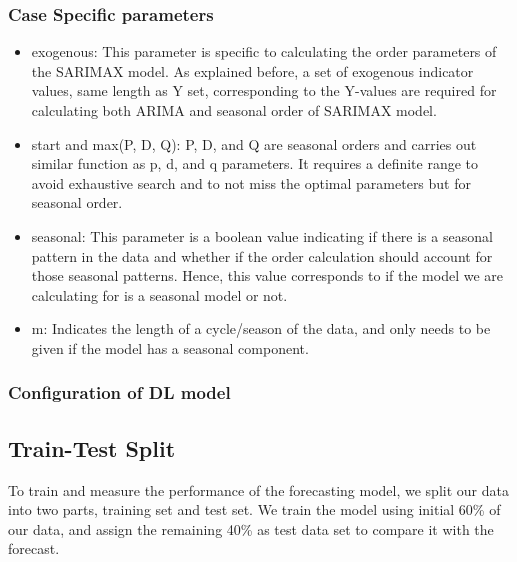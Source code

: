 \documentclass[]{usiinfbachelorproject}
\begin{document}
\subsubsection{Case Specific parameters}
\begin{itemize}
 \item exogenous: This parameter is specific to calculating the order parameters of the SARIMAX model. As explained before, a set of exogenous indicator values, same length as Y set, corresponding to the Y-values are required for calculating both ARIMA and seasonal order of SARIMAX model. \\
 
 \item start and max(P, D, Q): P, D, and Q are seasonal orders and carries out similar function as p, d, and q parameters. It requires a definite range to avoid exhaustive search and to not miss the optimal parameters but for seasonal order. \\
 
 \item seasonal: This parameter is a boolean value indicating if there is a seasonal pattern in the data and whether if the order calculation should account for those seasonal patterns. Hence, this value corresponds to if the model we are calculating for is a seasonal model or not.\\
 
 \item m: Indicates the length of a cycle/season of the data, and only needs to be given if the model has a seasonal component.\\
\end{itemize}

\subsubsection{Configuration of DL model}


\subsection{Train-Test Split}
To train and measure the performance of the forecasting model, we split our data into two parts, training set and test set. We train the model using initial 60\% of our data, and assign the remaining 40\% as test data set to compare it with the forecast. \\
\end{document}
